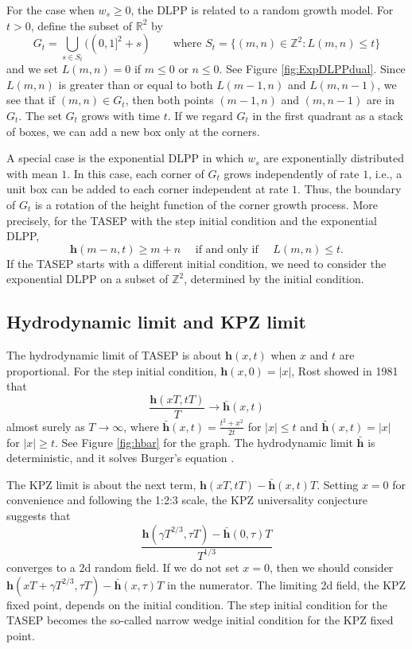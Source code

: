 \documentclass[10pt]{article}
\theoremstyle{plain}
\theoremstyle{definition}
\newcommand{\beq}{ \begin{equation} }
\newcommand{\eeq}{ \end{equation} }
\newcommand{\beqq}{ \begin{equation*} }
\newcommand{\eeqq}{ \end{equation*} }
\newcommand{\R}{\mathbb{R}}
\newcommand{\Z}{\mathbb{Z}}
\newcommand{\kheight}{\mathbf{h}} %
\numberwithin{equation}{section}
\begin{document}
For the case when $w_s\ge 0$, the DLPP is related to a random growth model. 
For $t>0$, define the subset of $\R^2$ by 
\beqq
	G_t= \bigcup_{s\in S_t} ( (0,1]^2+s)  \qquad 
	\text{where $S_t= \{(m, n)\in  \Z^2: L(m,n)\le t\}$}
\eeqq
and we set $L(m,n)=0$ if $m\le 0$ or $n\le 0$. See Figure \ref{fig:ExpDLPPdual}. 
Since $L(m,n)$ is greater than or equal to both $L(m-1, n)$ and $L(m, n-1)$,  
we see that if $(m,n)\in G_t$, then both points $(m-1, n)$ and $(m,n-1)$ are in $G_t$. 
The set $G_t$ grows with time $t$. 
If we regard $G_t$ in the first quadrant as a stack of boxes, we can add a new box only at the corners. %


A special case is the exponential DLPP in which $w_s$ are exponentially distributed with mean $1$. 
In this case, each corner of $G_t$ grows independently of rate $1$, i.e., a unit box can be added to each corner independent at rate $1$.  
Thus, the boundary of $G_t$ is a rotation of the height function of the corner growth process. 
More precisely, for the TASEP with the step initial condition and the exponential DLPP, 
\beq \label{eq:heightandDLPP}
	\kheight (m-n, t )\ge m+n \quad \text{ if and only if } \quad L(m,n)\le t .
\eeq
If the TASEP starts with a different initial condition, we need to consider the exponential DLPP on a subset of $\Z^2$, determined by the initial condition. 


\subsection{Hydrodynamic limit and KPZ limit}

The hydrodynamic limit of TASEP is about $\kheight(x,t)$ when $x$ and $t$ are proportional. 
For the step initial condition, $\kheight(x,0)=|x|$, Rost \cite{Rost81} showed in 1981 that 
\beqq
	\frac{\kheight(xT, tT)}{T}  \to \bar{\kheight}(x,t) 
\eeqq
almost surely as $T\to \infty$, where $\bar{\kheight}(x,t) = \frac{t^2+x^2}{2t}$ for $|x|\le t$ and $\bar{\kheight}(x,t) = |x|$ for $|x|\ge t$. 
See Figure \ref{fig:hbar} for the graph. 
The hydrodynamic limit $\bar{\kheight}$ is deterministic, and it solves Burger's equation \cite{Liggett85, Liggett99}.




The KPZ limit is about the next term, $\kheight(xT, tT)- \bar{\kheight}(x,t)T$. 
Setting $x=0$ for convenience and following the 1:2:3 scale, the KPZ universality conjecture suggests that 
\beqq
	\frac{\kheight(\gamma T^{2/3}, \tau T)- \bar{\kheight}(0,\tau)T}{T^{1/3}}
\eeqq  
converges to a 2d random field. 
If we do not set $x=0$, then we should consider $\kheight(xT+ \gamma T^{2/3}, \tau T)- \bar{\kheight}(x,\tau)T$ in the numerator. 
The limiting 2d field, the KPZ fixed point, depends on the initial condition. The step initial condition for the TASEP becomes the so-called narrow wedge initial condition for the KPZ fixed point. 
\end{document}
